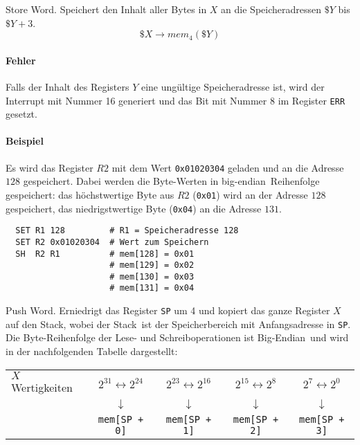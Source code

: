 \glqq Store Word\grqq.
Speichert den Inhalt aller Bytes in $X$ an die Speicheradressen $\$Y$ bis 
$\$Y + 3$.
\[
    \$X \to mem_{4}(\$Y)
\]

\paragraph{Fehler}
Falls der Inhalt des Registers $Y$ eine ungültige Speicheradresse ist,
wird der Interrupt mit Nummer 16 generiert und das Bit mit Nummer 8 im Register
\texttt{ERR} gesetzt.


\paragraph{Beispiel}
Es wird das Register $R2$ mit dem Wert \texttt{0x01020304} geladen und an die
Adresse $128$ gespeichert. Dabei werden die Byte-Werten in 
\glqq big-endian\grqq\ Reihenfolge gespeichert: das höchstwertige Byte aus $R2$
(\texttt{0x01}) wird an der Adresse $128$ gespeichert, das niedrigstwertige
Byte (\texttt{0x04}) an die Adresse $131$.

\begin{lstlisting}
  SET R1 128         # R1 = Speicheradresse 128
  SET R2 0x01020304  # Wert zum Speichern
  SH  R2 R1          # mem[128] = 0x01
                     # mem[129] = 0x02
                     # mem[130] = 0x03
                     # mem[131] = 0x04
\end{lstlisting}




\glqq Push Word\grqq.
Erniedrigt das Register \texttt{SP} um 4 und kopiert das ganze Register $X$ auf
den Stack, wobei der \glqq Stack\grqq\ ist der Speicherbereich mit
Anfangsadresse in \texttt{SP}.
Die Byte-Reihenfolge der Lese- und Schreiboperationen ist \glqq Big-Endian\grqq\
und wird in der nachfolgenden Tabelle dargestellt:
\begin{center}
\begin{tabular}{l|cccc}
  \toprule
  $X$  Wertigkeiten &
  $2^{31} \leftrightarrow 2^{24}$ &
  $2^{23} \leftrightarrow 2^{16}$ &
  $2^{15} \leftrightarrow 2^{8}$  &
  $2^{7}  \leftrightarrow 2^{0}$ 
  \\
  &
  $\downarrow$ & $\downarrow$ & $\downarrow$ & $\downarrow$ 
  \\
  \text{Stack-Bereich} &
  \texttt{mem[SP + 0]} &
  \texttt{mem[SP + 1]} &
  \texttt{mem[SP + 2]} &
  \texttt{mem[SP + 3]}
  \\\bottomrule
\end{tabular}
\end{center}


